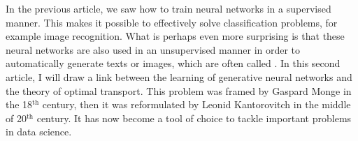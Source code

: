 In the previous article, we saw how to train neural networks in a supervised manner. This makes it possible to effectively solve classification problems, for example image recognition.
%
What is perhaps even more surprising is that these neural networks are also used in an unsupervised manner in order to automatically generate  texts or images, which are often called .
%
In this second article, I will draw a link between the learning of generative neural networks and the theory of optimal transport. This problem was framed by Gaspard Monge in the 18$^{\text{th}}$ century, then it was reformulated by Leonid Kantorovitch in the middle of 20$^{\text{th}}$ century. It has now become a tool of choice to tackle important problems in data science.